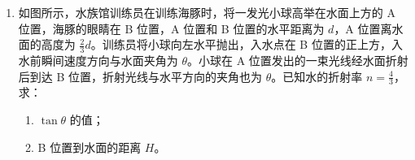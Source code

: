 \documentclass[\gkver]{gaokaozhenti}
\begin{document}
\begin{enumerate}
{	$\frac{1}{E}=\frac{4.9-2.0}{35}$

	解得 $E=12\UV$

	$\frac{R_{\mathrm{A}}+R_{0}+r}{E}=2$

	解得 $r=3.0\UO$

	再将 $\mathrm{S}_{2}$ 置于位置 2，此时电流表读数为 $0.400\UA$，则

	$E=I^{\prime}(r+R_{0}+R_{\mathrm{A}}+R_{x})$

	解得 $R_{x}=6.0\UO$

	$R_{x}=\rho\frac{L}{S}=\rho\frac{L}{\frac{1}{4}\pi D^{2}}$

	根据

	解得 $\rho=\frac{\pi D^{2}R_{x}}{4L}$

	（3）由（2）可知 $E=12\UV$，$r=3.0\UO$

	（4）根据表达式 $E=I^{\prime}(r+R_{0}+R_{\mathrm{A}}+R_{x})$

	因电源电动势变小，内阻变大，则当安培表有相同读数时，得到的 $R_{x}$ 的值偏小，即 $R_{x}$ 测量值偏小。
}

\item
如图所示，水族馆训练员在训练海豚时，将一发光小球高举在水面上方的 A 位置，海豚的眼睛在 B 位置，A 位置和 B 位置的水平距离为 $d$，A 位置离水面的高度为 $\frac{2}{3}d$。训练员将小球向左水平抛出，入水点在 B 位置的正上方，入水前瞬间速度方向与水面夹角为 $\theta$。小球在 A 位置发出的一束光线经水面折射后到达 B 位置，折射光线与水平方向的夹角也为 $\theta$。已知水的折射率 $n=\frac{4}{3}$，求：
\begin{enumerate}
	\item
	$\tan\theta$ 的值；
	\item
	B 位置到水面的距离 $H$。
\end{enumerate}

\end{enumerate}
\end{document}
